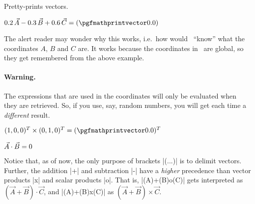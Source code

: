 \documentclass[a4paper]{ltxdoc}
\begin{document}
\begin{command}{\pgfmathprintvector{}}
   Pretty-prints vectors.
\end{command}


\begin{codeexample}[width=6.5cm]
%
$0.2\,\vec A-0.3\,\vec B+0.6\,\vec C
=(\pgfmathprintvector\pgfmathresult)$
\end{codeexample}

The alert reader may wonder why this works, i.e.\ how would \tikzname\ ``know''
what the coordinates $A$, $B$ and $C$ are. It works because the coordinates in
\tikzname\ are global, so they get remembered from the above example.

\paragraph{Warning.} The expressions that are used in the coordinates will only
be evaluated when they are retrieved. So, if you use, say, random numbers, you
will get each time a \emph{different} result.

\begin{codeexample}[width=4cm]
\end{codeexample}

\begin{codeexample}[width=5.2cm]
%
$(1,0,0)^T\times(0,1,0)^T=
(\pgfmathprintvector\pgfmathresult)^T$
\end{codeexample}

\begin{codeexample}[width=5.2cm]
%
$\vec A\cdot \vec B=
\pgfmathprintnumber\pgfmathresult$
\end{codeexample}

Notice that, as of now, the only purpose of brackets |(...)| is to delimit
vectors. Further, the addition |+| and subtraction |-| have a \emph{higher}
precedence than vector products |x| and scalar products |o|. That is,
|(A)+(B)o(C)| gets interpreted as $(\vec A+\vec B)\cdot\vec C$, and
|(A)+(B)x(C)| as $(\vec A+\vec B)\times\vec C$.
\end{document}
